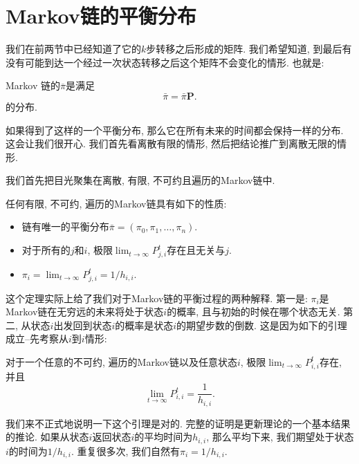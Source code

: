 \section{Markov链的平衡分布}

我们在前两节中已经知道了它的$k$步转移之后形成的矩阵. 我们希望知道, 到最后有没有可能到达一个经过一次状态转移之后这个矩阵不会变化的情形. 也就是: 

\begin{definition}
    Markov 链的$\overline \pi$是满足
    $$
    \bar{\pi}=\bar{\pi} \mathbf{P} .
    $$
    的分布. 
\end{definition}

如果得到了这样的一个平衡分布, 那么它在所有未来的时间都会保持一样的分布. 这会让我们很开心. 我们首先看离散有限的情形, 然后把结论推广到离散无限的情形. 

我们首先把目光聚集在离散, 有限, 不可约且遍历的Markov链中. 

\begin{theorem}
    \label{thm:stab-dist-prop}
    任何有限, 不可约, 遍历的Markov链具有如下的性质: 
    \begin{itemize}
        \item 链有唯一的平衡分布$\bar{\pi}=\left(\pi_0, \pi_1, \ldots, \pi_n\right)$.
        \item 对于所有的$j$和$i$, 极限$\lim _{t \rightarrow \infty} P_{j, i}^t$存在且无关与$j$. 
        \item $\pi_i=\lim _{t \rightarrow \infty} P_{j, i}^t=1 / h_{i, i}$.
    \end{itemize}
\end{theorem}

这个定理实际上给了我们对于Markov链的平衡过程的两种解释. 第一是: $\pi_i$是Markov链在无穷远的未来将处于状态$i$的概率, 且与初始的时候在哪个状态无关. 第二, 从状态$i$出发回到状态$i$的概率是状态$i$的期望步数的倒数. 这是因为如下的引理成立--先考察从$i$到$i$情形: 

\begin{lemma}
    对于一个任意的不可约, 遍历的Markov链以及任意状态$i$, 极限$\lim _{t \rightarrow \infty} P_{i, i}^t$存在, 并且
    $$\lim _{t \rightarrow \infty} P_{i, i}^t=\frac{1}{h_{i, i}}.$$
\end{lemma}

我们来不正式地说明一下这个引理是对的. 完整的证明是更新理论的一个基本结果的推论. 如果从状态$i$返回状态$i$的平均时间为$h_{i,i}$, 那么平均下来, 我们期望处于状态$i$的时间为$1/h_{i,i}$. 重复很多次, 我们自然有$\pi_i = 1/h_{i,i}$. 

